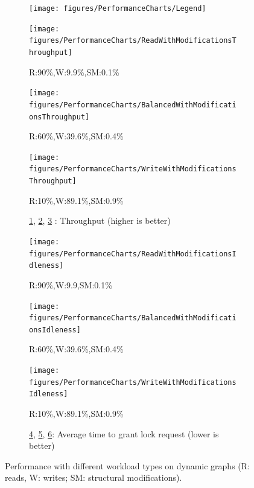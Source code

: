 \begin{figure}
	\centering
	\captionsetup{justification=centering}
		\begin{subfigure}[b]{\textwidth}
			\centering
			\texttt{[image: figures/PerformanceCharts/Legend]}
		\end{subfigure}
		\begin{subfigure}[b]{.33\textwidth}
			\texttt{[image: figures/PerformanceCharts/ReadWithModificationsThroughput]}
			\caption{R:90\%,W:9.9\%,SM:0.1\%}
			\label{rm}
		\end{subfigure}
		\begin{subfigure}[b]{.325\textwidth}
			\texttt{[image: figures/PerformanceCharts/BalancedWithModificationsThroughput]}
			\caption{R:60\%,W:39.6\%,SM:0.4\%}
			\label{bm}
		\end{subfigure}
		\begin{subfigure}[b]{.325\textwidth}
			\texttt{[image: figures/PerformanceCharts/WriteWithModificationsThroughput]}
			\caption{R:10\%,W:89.1\%,SM:0.9\%}
			\label{wm}
		\end{subfigure}
		\begin{subfigure}[b]{\textwidth}
			\caption*{\cref{rm}, \cref{bm}, \cref{wm} : Throughput (higher is better)}
		\end{subfigure}
	
	
	
		\begin{subfigure}[b]{.33\textwidth}
			\texttt{[image: figures/PerformanceCharts/ReadWithModificationsIdleness]}
			\caption{R:90\%,W:9.9,SM:0.1\%}
			\label{irm}
		\end{subfigure}
		\begin{subfigure}[b]{.325\textwidth}
			\texttt{[image: figures/PerformanceCharts/BalancedWithModificationsIdleness]}
			\caption{R:60\%,W:39.6\%,SM:0.4\%}
			\label{ibm}
		\end{subfigure}
		\begin{subfigure}[b]{.325\textwidth}
			\texttt{[image: figures/PerformanceCharts/WriteWithModificationsIdleness]}
			\caption{R:10\%,W:89.1\%,SM:0.9\%}
			\label{iwm}
		\end{subfigure}
		\begin{subfigure}[b]{\textwidth}
			\caption*{\cref{irm}, \cref{ibm}, \cref{iwm}: Average time to grant lock request  (lower is better)}
		\end{subfigure}
	
		\caption{Performance with different workload types on dynamic graphs  (R: reads, W: writes; SM: structural modifications).}
		\label{dynamicPerf}
	\end{figure}

